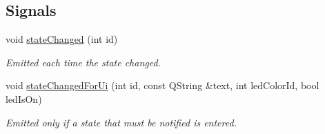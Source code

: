 \subsection*{Signals}
\begin{DoxyCompactItemize}
\item 
\hypertarget{classmdt_state_machine_a57952ce2e02e44a57c70695067dc8b86}{
void \hyperlink{classmdt_state_machine_a57952ce2e02e44a57c70695067dc8b86}{stateChanged} (int id)}
\label{classmdt_state_machine_a57952ce2e02e44a57c70695067dc8b86}

\begin{DoxyCompactList}\small\item\em Emitted each time the state changed. \end{DoxyCompactList}\item 
void \hyperlink{classmdt_state_machine_a3ff507d3d9256107038ceb0c3dfba9c8}{stateChangedForUi} (int id, const QString \&text, int ledColorId, bool ledIsOn)
\begin{DoxyCompactList}\small\item\em Emitted only if a state that must be notified is entered. \end{DoxyCompactList}\end{DoxyCompactItemize}

